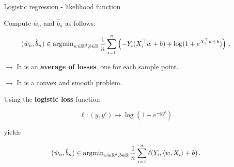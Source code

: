 \documentclass[xcolor={usenames,dvipsnames}]{beamer}
\begin{document}
\begin{frame}{Logistic regression - likelihood function}
		
Compute $\hat w_n$ and $\hat b_n$ as follows:

\begin{align*}
(\hat w_n, \hat b_n) \in \operatorname{argmin}_{w \in \mathbb{R}^d, b \in \mathbb{R}}
\frac 1n \sum_{i=1}^n\left(-Y_i (X_i^\top w+ b) +  \log(1+ e^{X_i^\top w + b})\right)\,.
\end{align*}

\vspace{.3cm}

$\rightharpoondown$ It is an \textbf{average of losses}, one for each sample point.

$\rightharpoondown$ It is a \alert{convex and smooth problem}.


\medskip

Using the \textbf{\alert{logistic loss}} function
\smallskip 

\begin{equation*}
\ell: (y, y') \mapsto \log(1 + e^{-y y'}) 
\end{equation*}

yields

\begin{equation*}
(\hat w_n, \hat b_n) \in \operatorname{argmin}_{w \in \mathbb{R}^d, b \in \mathbb{R}}
\frac 1n \sum_{i=1}^n \ell(Y_i, \langle w,X_i \rangle + b)\,.
\end{equation*}
\end{frame}
\end{document}
